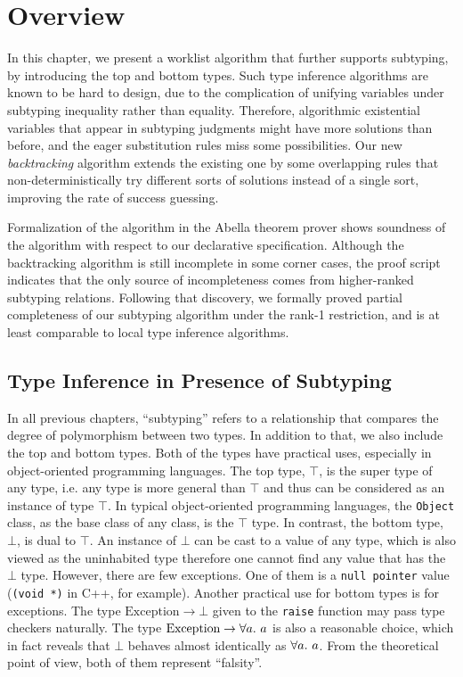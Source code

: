 
\section{Overview}

In this chapter, we present a worklist algorithm
that further supports subtyping,
by introducing the top and bottom types.
Such type inference algorithms are known to be hard to design,
due to the complication of unifying variables under subtyping inequality
rather than equality.
Therefore, algorithmic existential variables that appear in subtyping judgments
might have more solutions than before,
and the eager substitution rules miss some possibilities.
Our new \emph{backtracking} algorithm extends the existing one by some overlapping rules that
non-deterministically try different sorts of solutions instead of a single sort,
improving the rate of success guessing.

Formalization of the algorithm in the Abella theorem prover shows soundness of the algorithm
with respect to our declarative specification.
Although the backtracking algorithm is still incomplete in some corner cases,
the proof script indicates that the only source of incompleteness comes from
higher-ranked subtyping relations.
Following that discovery, we formally proved partial completeness of our subtyping algorithm
under the rank-1 restriction,
and is at least comparable to local type inference algorithms.

\subsection{Type Inference in Presence of Subtyping}

In all previous chapters, ``subtyping'' refers to a relationship that compares
the degree of polymorphism between two types.
In addition to that, we also include the top and bottom types.
Both of the types have practical uses, especially in object-oriented programming languages.
The top type, $\top$, is the super type of any type,
i.e. any type is more general than $\top$
and thus can be considered as an instance of type $\top$.
In typical object-oriented programming languages, the \texttt{Object} class,
as the base class of any class, is the $\top$ type.
In contrast, the bottom type, $\bot$, is dual to $\top$.
An instance of $\bot$ can be cast to a value of any type,
which is also viewed as the uninhabited type therefore
one cannot find any value that has the $\bot$ type.
However, there are few exceptions.
One of them is a \texttt{null pointer} value (\texttt{(void *)} in C++, for example).
Another practical use for bottom types is for exceptions.
The type $\text{Exception} \to \bot$ given to the \texttt{raise}
function may pass type checkers naturally.
The type $\text{Exception} \to \all a$ is also a reasonable choice,
which in fact reveals that $\bot$ behaves almost identically as $\all a$.
From the theoretical point of view, both of them represent ``falsity''.



